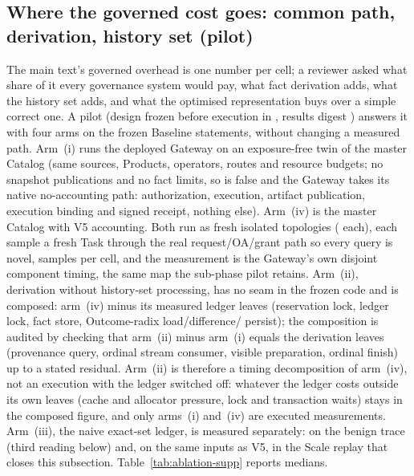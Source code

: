 \documentclass[journal,onecolumn]{IEEEtran}
\newcommand{\code}[1]{\texttt{\detokenize{#1}}}
\begin{document}
\subsection{Where the governed cost goes: common path, derivation, history set (pilot)}
\label{sec:ablation-supp}

The main text's governed overhead is one number per cell; a reviewer
asked what share of it every governance system would pay, what fact
derivation adds, what the history set adds, and what the optimised
representation buys over a simple correct one. A pilot (design frozen before
execution in , results digest
\BFiveResultsDigest{}) answers it with four arms on the frozen Baseline
statements, without changing a measured path. Arm~(i) runs the deployed
Gateway on an exposure-free twin of the master Catalog (same sources,
Products, operators, routes and resource budgets; no snapshot publications
and no fact limits, so \code{ExposureGrant.Enabled()} is false and the
Gateway takes its native no-accounting path: authorization, execution,
artifact publication, execution binding and signed receipt, nothing else).
Arm~(iv) is the master Catalog with V5 accounting. Both run as fresh
isolated topologies (\BFiveDeployments{} each), each sample a fresh Task
through the real request/OA/grant path so every query is novel,
\BFiveSamplesPerCell{} samples per cell, and the measurement is the Gateway's
own disjoint component timing, the same map the sub-phase pilot retains.
Arm~(ii), derivation without history-set processing, has no seam in the
frozen code and is composed: arm~(iv) minus its measured ledger leaves
(reservation lock, ledger lock, fact store, Outcome-radix load/difference/
persist); the composition is audited by checking that arm~(ii) minus arm~(i)
equals the derivation leaves (provenance query, ordinal stream consumer,
visible preparation, ordinal finish) up to a stated residual. Arm~(ii) is
therefore a timing decomposition of arm~(iv), not an execution with the
ledger switched off: whatever the ledger costs outside its own leaves (cache
and allocator pressure, lock and transaction waits) stays in the composed
figure, and only arms~(i) and~(iv) are executed measurements. Arm~(iii), the
naive exact-set ledger, is measured separately: on the benign trace (third
reading below) and, on the same inputs as V5, in the Scale replay that closes
this subsection.
Table~\ref{tab:ablation-supp} reports medians.
\end{document}
